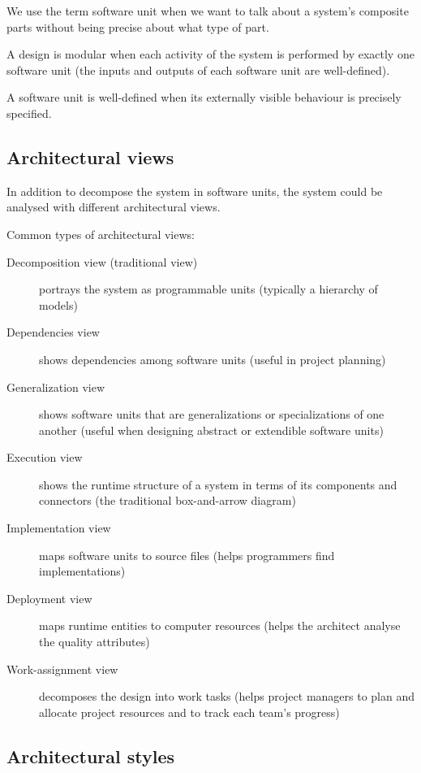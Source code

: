 We use the term software unit when we want to talk about a system’s composite
parts without being precise about what type of part. \newline

A design is modular when each activity of the system is performed by exactly one
software unit (the inputs and outputs of each software unit are well-defined).
\newline

A software unit is well-defined when its externally visible behaviour is
precisely specified.

\subsection{Architectural views}

In addition to decompose the system in software units, the system could be
analysed with different architectural views. \newline

Common types of architectural views:

\begin{description}
    \item[Decomposition view (traditional view)] portrays the system as
    programmable units (typically a hierarchy of models)
    \item[Dependencies view] shows dependencies among software units (useful in
    project planning)
    \item[Generalization view] shows software units that are generalizations or
    specializations of one another (useful when designing abstract or extendible
    software units)
    \item[Execution view] shows the runtime structure of a system in terms of
    its components and connectors (the traditional box-and-arrow diagram)
    \item[Implementation view] maps software units to source files (helps
    programmers find implementations)
    \item[Deployment view] maps runtime entities to computer resources (helps
    the architect analyse the quality attributes)
    \item[Work-assignment view] decomposes the design into work tasks (helps
    project managers to plan and allocate project resources and to track each
    team's progress)
\end{description}

\subsection{Architectural styles}

